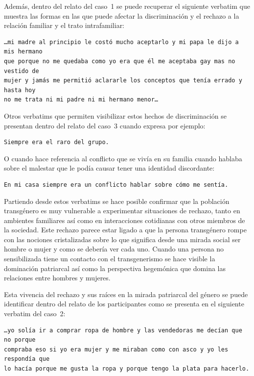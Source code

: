 Además, dentro del relato del caso~1 se puede recuperar el siguiente verbatim
que muestra las formas en las que puede afectar la discriminación y el rechazo
a la relación familiar y el trato intrafamiliar:

\begin{verbatim}
…mi madre al principio le costó mucho aceptarlo y mi papa le dijo a mis hermano
que porque no me quedaba como yo era que él me aceptaba gay mas no vestido de
mujer y jamás me permitió aclararle los conceptos que tenía errado y hasta hoy
no me trata ni mi padre ni mi hermano menor…
\end{verbatim}

Otros verbatims que permiten visibilizar estos hechos de discriminación se
presentan dentro del relato del caso~3 cuando expresa por ejemplo:

\begin{verbatim}
Siempre era el raro del grupo.
\end{verbatim}

O cuando hace referencia al conflicto que se vivía en su familia cuando hablaba
sobre el malestar que le podía causar tener una identidad discordante:

\begin{verbatim}
En mi casa siempre era un conflicto hablar sobre cómo me sentía.
\end{verbatim}

Partiendo desde estos verbatims se hace posible confirmar que la población
transgénero es muy vulnerable a experimentar situaciones de rechazo, tanto en
ambientes familiares así como en interacciones cotidianas con otros miembros de
la sociedad. Este rechazo parece estar ligado a que la persona transgénero rompe
con las nociones cristalizadas sobre lo que significa desde una mirada social
ser hombre o mujer y como se debería ver cada uno. Cuando una persona no
sensibilizada tiene un contacto con el transgenerismo se hace visible la
dominación patriarcal así como la perspectiva hegemónica que domina las
relaciones entre hombres y mujeres.

Esta vivencia del rechazo y sus raíces en la mirada patriarcal del género se
puede identificar dentro del relato de los participantes como se presenta en el
siguiente verbatim del caso~2:

\begin{verbatim}
…yo solía ir a comprar ropa de hombre y las vendedoras me decían que no porque
compraba eso si yo era mujer y me miraban como con asco y yo les respondía que
lo hacía porque me gusta la ropa y porque tengo la plata para hacerlo.
\end{verbatim}

